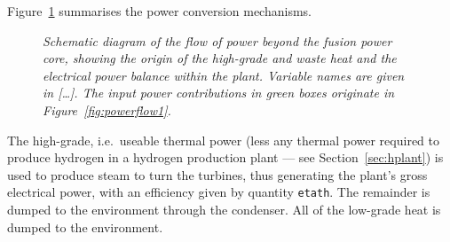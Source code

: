\documentclass[11pt,a4paper]{report}
\begin{document}
Figure~\ref{fig:powerflow3} summarises the power conversion mechanisms.

\begin{figure}[tbph]
\caption[Power flow outside the fusion power plant core]
{\label{fig:powerflow3} \textit{Schematic diagram of the flow of power beyond
    the fusion power core, showing the origin of the high-grade and waste
    heat and the electrical power balance within the plant. Variable
    names are given in [\ldots]. The input power contributions in green boxes
    originate in Figure~\ref{fig:powerflow1}. }  }
\end{figure}

The high-grade, i.e.\ useable thermal power (less any thermal power required to
produce hydrogen in a hydrogen production plant --- see
Section~\ref{sec:hplant}) is used to produce steam to turn the turbines, thus
generating the plant's gross electrical power, with an efficiency given by
quantity \texttt{etath}. The remainder is dumped to the environment through the condenser.  All of the low-grade heat is dumped to the environment.
\end{document}
